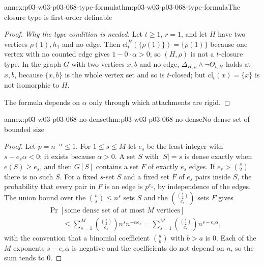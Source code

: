 \begin{annexitem}{annex:p03-w03-p03-068-type-formula}{thm:p03-w03-p03-068-type-formula}{The closure type is first-order definable}
\begin{proof}
\emph{Why the type condition is needed.}  Let \(t\geq1\), \(r=1\), and let
\(H\) have two vertices \(\rho(1),h_1\) and no edge.  Then \(\mathrm{cl}^H_t(\{\rho(1)\})=\{\rho(1)\}\)
because one vertex with no counted edge gives \(1-0\cdot\alpha>0\); so \((H,\rho)\)
is not a \(t\)-closure type.  In the graph \(G\) with two vertices \(x,b\) and
no edge, \(\Delta_{H,\rho}\wedge\neg\Theta_{t,H}\) holds at \(x,b\), because
\(\{x,b\}\) is the whole vertex set and so is \(t\)-closed; but
\(\mathrm{cl}_t(x)=\{x\}\) is not isomorphic to \(H\).

The formula depends on \(\alpha\) only through which attachments are rigid.
\end{proof}
\end{annexitem}

\begin{annexitem}{annex:p03-w03-p03-068-no-dense}{thm:p03-w03-p03-068-no-dense}{No dense set of bounded size}
\begin{proof}
Let \(p=n^{-\alpha}\leq1\).  For \(1\leq s\leq M\) let \(e_s\) be the least
integer with \(s-e_s\alpha<0\); it exists because \(\alpha>0\).  A set \(S\)
with \(|S|=s\) is dense exactly when \(e(S)\geq e_s\), and then \(G[S]\)
contains a set \(F\) of exactly \(e_s\) edges.  If \(e_s>\binom s2\) there is
no such \(S\).  For a fixed \(s\)-set \(S\) and a fixed set \(F\) of \(e_s\)
pairs inside \(S\), the probability that every pair in \(F\) is an edge is
\(p^{e_s}\), by independence of the edges.  The union bound over the
\(\binom ns\leq n^s\) sets \(S\) and the \(\binom{\binom s2}{e_s}\) sets \(F\)
gives
\begin{align*}
  &\Pr[\text{some dense set of at most }M\text{ vertices}]\\
  &\qquad\leq\sum_{s=1}^{M}\binom{\binom s2}{e_s}n^{s}n^{-\alpha e_s}
  =\sum_{s=1}^{M}\binom{\binom s2}{e_s}n^{s-e_s\alpha},
\end{align*}
with the convention that a binomial coefficient \(\binom ab\) with \(b>a\) is
\(0\).  Each of the \(M\) exponents \(s-e_s\alpha\) is negative and the
coefficients do not depend on \(n\), so the sum tends to \(0\).
\end{proof}
\end{annexitem}

